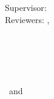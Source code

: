 \begin{titlepage}
	\begin{minipage}[t]{.27\textwidth}
		\raggedleft
		\textit{}
	\end{minipage}
	\hspace*{15pt}
	\begin{minipage}[t]{.65\textwidth}
		{\Large \thesisReviewerTwoTitle\ \thesisReviewerTwo} \\
	  	{\small \thesisReviewerTwoDepartment} \\[-1mm]
		{\small \thesisReviewerTwoUniversity}
	\end{minipage} \\[20mm]
	
	\centering
	\thesisDate \\
	
\end{titlepage}


\hfill
\vfill
{
	\small
	\textbf{\thesisAuthor} \\
	\textit{\thesisTitle} \\
	\thesisDate \\
	Supervisor: \thesisSupervisorTitle\ \thesisSupervisor\\
	Reviewers:  \thesisReviewerOne, \thesisReviewerTwo\\
	[1.5em]
	\textbf{\thesisUniversity} \\
	\thesisUniversityInstitute \\
	\thesisUniversityDepartment \\
	\thesisUniversityGroup \\
	\thesisUniversityCity
	\thesisUniversityStreetAddress \\
	\thesisUniversityPostalCode\ and \thesisUniversityCity
}
